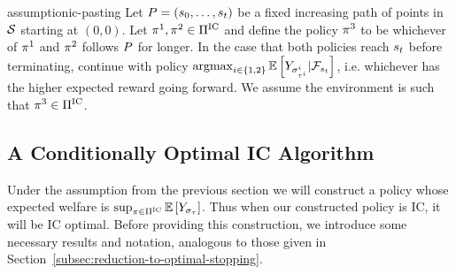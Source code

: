 \begin{restatable}{assumption}{ic-pasting}
    \label{assum:ic-pasting}
    Let 
    \(
        P
        =
        \left(
            s_{0},
            \ldots,
            s_{t}
        \right)
    \)
    be a fixed increasing path of points in $\mathcal{S}$ starting at $(0,0)$.
    Let 
    \(
        \pi^1,\pi^2\in\Pi^{\text{IC}} 
    \)
    and define the policy $\pi^3$ to be whichever of $\pi^1$ and $\pi^2$
    follows $P$ for longer. In the case that both policies reach $s_{t}$ before terminating,
    continue with policy
    \(
        \operatorname*{argmax}_{
            i\in\left\{1,2\right\}
        }
        \mathbb{E}\left[
            Y_{
                \sigma_{
                    \tau^i
                }^i
            }
            |
            \mathcal{F}_{
                s_{t}
            }
        \right]
    \),
    i.e.
    whichever has the higher expected reward going forward.
    We assume the environment is such that $\pi^3\in\Pi^{\text{IC}}$.
\end{restatable}  

\subsection{A Conditionally Optimal IC Algorithm}

Under the assumption from the previous section we will construct a policy whose expected welfare
is 
\(
    \sup_{
        \pi\in\Pi^{\text{IC}}
    }
    \mathbb{E}\left[
        Y_{
            \sigma_{\tau}
        }
    \right]
\). Thus when our constructed policy is IC, it will be IC optimal.
Before providing this construction, we introduce some necessary results and notation,
analogous to those given in Section~\ref{subsec:reduction-to-optimal-stopping}.



